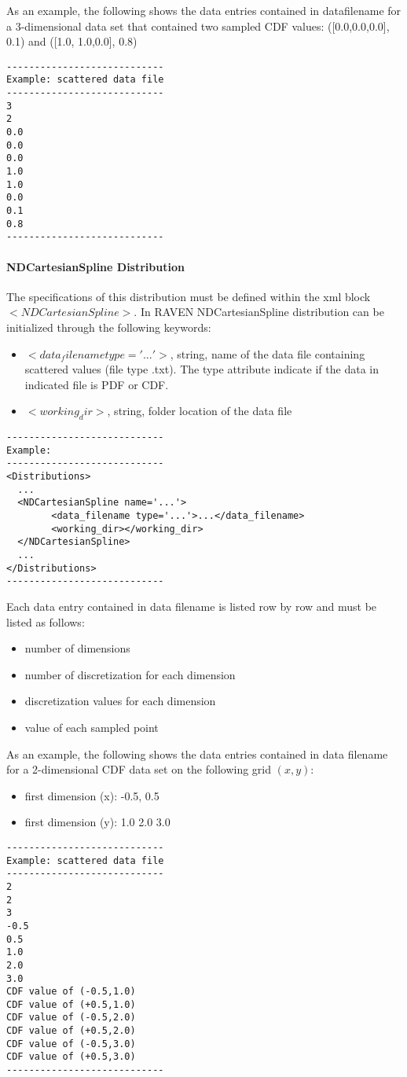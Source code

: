As an example, the following shows the data entries contained in data\textunderscore filename for a 3-dimensional data set that contained two sampled CDF values: ([0.0,0.0,0.0], 0.1) and ([1.0, 1.0,0.0], 0.8)

\begin{lstlisting}
----------------------------
Example: scattered data file
----------------------------
3
2
0.0
0.0
0.0
1.0
1.0
0.0
0.1
0.8
----------------------------
\end{lstlisting}

\paragraph{NDCartesianSpline Distribution}
\label{NDCartesianSpline}
The specifications of this distribution must be defined within the xml block $<NDCartesianSpline>$.  In RAVEN NDCartesianSpline distribution can be initialized through the following keywords:
\begin{itemize}
\item $<data_filename   type='...' >$, string,  name of the data file containing scattered values (file type .txt). The type attribute indicate if the data in indicated file is PDF or CDF. 
\item $<working_dir>$, string, folder location of the data file
\end{itemize}

\begin{lstlisting}[style=XML]
----------------------------
Example:
----------------------------
<Distributions>
  ...
  <NDCartesianSpline name='...'>
        <data_filename type='...'>...</data_filename>
        <working_dir></working_dir>
  </NDCartesianSpline>
  ...
</Distributions>
----------------------------
\end{lstlisting}

Each data entry contained in data \textunderscore filename is listed row by row and must be listed as follows:
\begin{itemize}
\item number of dimensions
\item number of discretization for each dimension
\item discretization values for each dimension
\item value of each sampled point
\end{itemize}

As an example, the following shows the data entries contained in data \textunderscore filename for a 2-dimensional CDF data set on the following grid $(x,y)$:
\begin{itemize}
\item first dimension (x): -0.5, 0.5
\item first dimension (y): 1.0 2.0 3.0
\end{itemize}

\begin{lstlisting}
----------------------------
Example: scattered data file
----------------------------
2
2
3
-0.5
0.5
1.0 
2.0 
3.0
CDF value of (-0.5,1.0)
CDF value of (+0.5,1.0)
CDF value of (-0.5,2.0)
CDF value of (+0.5,2.0)
CDF value of (-0.5,3.0)
CDF value of (+0.5,3.0)
----------------------------
\end{lstlisting}